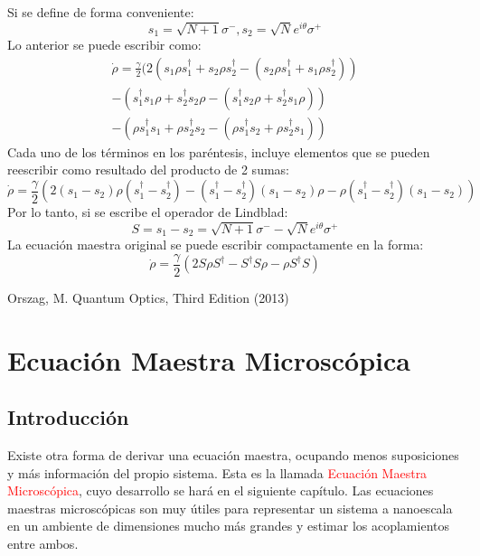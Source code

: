 \documentclass{book}
\begin{document}
Si se define de forma conveniente:
\begin{equation}{s_1=\sqrt{N+1}\sigma^-, s_2=\sqrt{N}e^{i\theta}\sigma^+}\end{equation}
Lo anterior se puede escribir como:
\begin{equation}\begin{aligned}{\dot{\rho}=\frac{\gamma}{2}(2(s_1\rho s_1^\dag+s_2\rho s_2^\dag-(s_2 \rho s_1^\dag +s_1\rho s_2^\dag))} \\{ -(s_1^\dag s_1\rho+ s_2^\dag s_2 \rho -(s_1^\dag s_2\rho + s_2^\dag s_1\rho))}\\  {-(\rho s_1^\dag s_1+\rho s_2^\dag s_2  -(\rho s_1^\dag s_2 +\rho s_2^\dag s_1) )}\end{aligned}\end{equation}
Cada uno de los términos en los paréntesis, incluye elementos que se pueden reescribir como resultado del producto de 2 sumas:
\begin{equation}{\dot{\rho}=\frac{\gamma}{2}(2(s_1-s_2)\rho(s_1^\dag-s_2^\dag)-(s_1^\dag-s_2^\dag)(s_1-s_2)\rho-\rho(s_1^\dag-s_2^\dag)(s_1-s_2))}\end{equation}
Por lo tanto, si se escribe el operador de Lindblad:
\begin{equation}{S=s_1-s_2=\sqrt{N+1}\sigma^--\sqrt{N}e^{i\theta}\sigma^+}\end{equation}
La ecuación maestra original se puede escribir compactamente en la forma:
\begin{equation}{\dot{\rho}=\frac{\gamma}{2}(2S\rho S^\dag-S^\dag S\rho-\rho S^\dag S)}\end{equation}
\begin{thebibliography}{9}
 Orszag, M. Quantum Optics, Third Edition (2013)
\end{thebibliography}
\chapter{Ecuación Maestra Microscópica}
\section{Introducción}
Existe otra forma de derivar una ecuación maestra, ocupando menos suposiciones y más información del propio sistema. Esta es la llamada  \textcolor{red}{Ecuación Maestra Microscópica}, cuyo desarrollo se hará en el siguiente capítulo. Las ecuaciones maestras microscópicas son muy útiles para representar un sistema a nanoescala en un ambiente de dimensiones mucho más grandes y estimar los acoplamientos entre ambos.\\
\end{document}
